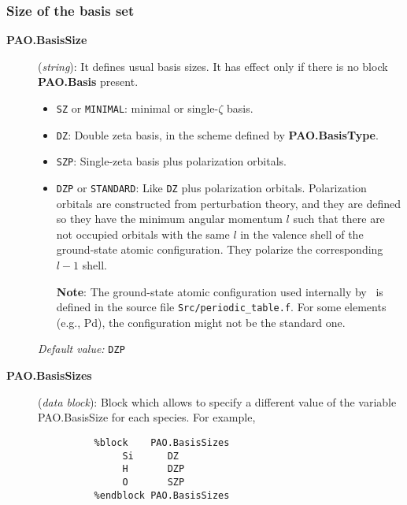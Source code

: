 \subsubsection{Size of the basis set}
\begin{description}

\item[\textbf{PAO.BasisSize}] (\textit{string}):
It defines usual basis sizes. It has effect only if there is no
block \textbf{PAO.Basis} present.

\begin{itemize}

  \item \texttt{SZ} or
  \texttt{MINIMAL}: minimal or
  single-$\zeta$ basis.

\item \texttt{DZ}: Double zeta basis, in the scheme
defined by \textbf{PAO.BasisType}.

\item \texttt{SZP}: Single-zeta basis plus polarization
orbitals.

\item \texttt{DZP} or \texttt{STANDARD}: Like \texttt{DZ} plus
polarization orbitals.  Polarization orbitals are constructed from
perturbation theory, and they are
defined so they have the minimum angular
momentum $l$ such that there are not occupied orbitals with the same
$l$ in the valence shell of the ground-state atomic
configuration. They polarize the corresponding $l-1$ shell.

\textbf{Note}: The ground-state atomic configuration used internally
by \siesta\ is defined in the source file \texttt{Src/periodic\_table.f}.
For some elements (e.g., Pd), the configuration might not be the
standard one.

\end{itemize}

\textit{Default value:} \texttt{DZP}

\item[\textbf{PAO.BasisSizes}](\textit{data block}):
Block which allows to specify a different value of the variable
PAO.BasisSize for each species. For example,
\begin{verbatim}
          %block    PAO.BasisSizes
               Si      DZ
               H       DZP
               O       SZP
          %endblock PAO.BasisSizes
\end{verbatim}

\end{description}

